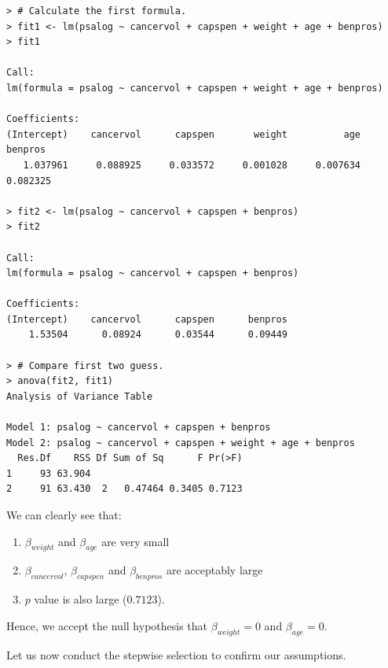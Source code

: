 \documentclass[12pt,letterpaper,titlepage,en-US]{article}
\begin{document}
\begin{lstlisting}
> # Calculate the first formula.
> fit1 <- lm(psalog ~ cancervol + capspen + weight + age + benpros)
> fit1

Call:
lm(formula = psalog ~ cancervol + capspen + weight + age + benpros)

Coefficients:
(Intercept)    cancervol      capspen       weight          age      benpros
   1.037961     0.088925     0.033572     0.001028     0.007634     0.082325

> fit2 <- lm(psalog ~ cancervol + capspen + benpros)
> fit2

Call:
lm(formula = psalog ~ cancervol + capspen + benpros)

Coefficients:
(Intercept)    cancervol      capspen      benpros
    1.53504      0.08924      0.03544      0.09449

> # Compare first two guess.
> anova(fit2, fit1)
Analysis of Variance Table

Model 1: psalog ~ cancervol + capspen + benpros
Model 2: psalog ~ cancervol + capspen + weight + age + benpros
  Res.Df    RSS Df Sum of Sq      F Pr(>F)
1     93 63.904
2     91 63.430  2   0.47464 0.3405 0.7123
\end{lstlisting}

We can clearly see that:
\begin{enumerate}
\item $\beta_{weight}$ and $\beta_{age}$ are very small
\item $\beta_{cancervol}$, $\beta_{capspen}$ and $\beta_{benpros}$ are acceptably large
\item  $p$ value is also large ($0.7123$).
\end{enumerate}  Hence, we accept the null hypothesis that $\beta_{weight} = 0$ and $\beta_{age} = 0$.


Let us now conduct the stepwise selection to confirm our assumptions.
\end{document}
